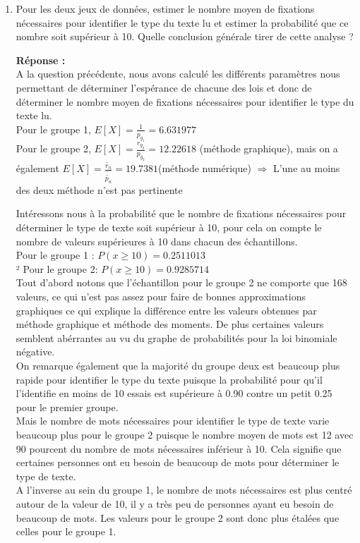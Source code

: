 \documentclass[12pt]{article}
\begin{document}
\begin{enumerate}
\item Pour les deux jeux de données, estimer le nombre moyen de fixations nécessaires pour identifier le type du texte lu et estimer la probabilité que ce nombre soit supérieur à 10. Quelle conclusion générale tirer de cette analyse ? \\
\vspace{3mm}

\textbf{Réponse :\\}
A la question précédente, nous avons calculé les différents paramètres nous permettant de déterminer l'espérance de chacune des lois et donc de déterminer le nombre moyen de fixations nécessaires pour identifier le type du texte lu. \\

 Pour le groupe 1, $E[X] = \frac{1}{p_{g_{1}}} = 6.631977 $ \\
Pour le groupe 2, $E[X] = \frac{r_{g_{2}}}{p_{g_{2}}} = 12.22618 $ (méthode graphique), mais on a également $E[X] = \frac{\tilde{r_n}}{\tilde{\tilde{p_n}}} = 19.7381$(méthode numérique) $\Rightarrow$ L'une au moins des deux méthode n'est pas pertinente

Intéressons nous à la probabilité que le nombre de fixations nécessaires pour déterminer le type de texte soit supérieur à 10, pour cela on compte le nombre de valeurs supérieures à 10 dans chacun des échantillons. \\
Pour le groupe 1 : $P(x \geq 10) = 0.2511013 $ \\²
Pour le groupe 2: $P(x \geq 10) = 0.9285714$\\

Tout d'abord notons que l'échantillon pour le groupe 2 ne comporte que 168 valeurs, ce qui n'est pas assez pour faire de bonnes approximations graphiques ce qui explique la différence entre les valeurs obtenues par méthode graphique et méthode des moments. De plus certaines valeurs semblent abérrantes au vu du graphe de probabilités pour la loi binomiale négative. \\
On remarque également que la majorité du  groupe deux est beaucoup plus rapide pour identifier le type du texte puisque la probabilité pour qu'il l'identifie en moins de 10 essais est supérieure à 0.90 contre un petit 0.25 pour le premier groupe.\\
Mais le nombre de mots nécessaires pour identifier le type de texte varie beaucoup plus pour le groupe 2 puisque le nombre moyen de mots est 12 avec 90 pourcent du nombre de mots nécessaires inférieur à 10. Cela signifie que certaines personnes ont eu besoin de beaucoup de mots pour déterminer le type de texte.\\
A l'inverse au sein du groupe 1, le nombre de mots nécessaires est plus centré autour de la valeur de 10, il y a très peu de personnes ayant eu besoin de beaucoup de mots.
Les valeurs pour le groupe 2 sont donc plus étalées que celles pour le groupe 1.


\end{enumerate}
\end{document}
